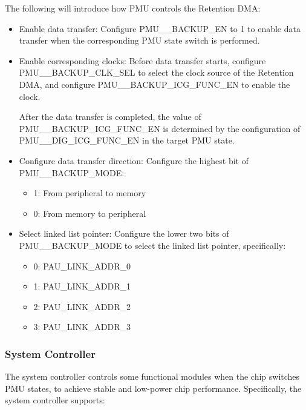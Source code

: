 \documentclass[main\_\_EN.tex]{subfiles}
\begin{document}
The following will introduce how PMU controls the Retention DMA:

\begin{itemize}
    \item Enable data transfer: Configure PMU\_\_BACKUP\_EN to 1 to enable data transfer when the corresponding PMU state switch is performed.
    \item Enable corresponding clocks: Before data transfer starts, configure PMU\_\_BACKUP\_CLK\_SEL to select the clock source of the Retention DMA, and configure PMU\_\_BACKUP\_ICG\_FUNC\_EN to enable the clock.

    After the data transfer is completed, the value of PMU\_\_BACKUP\_ICG\_FUNC\_EN is determined by the configuration of PMU\_\_DIG\_ICG\_FUNC\_EN in the target PMU state.

    \item Configure data transfer direction: Configure the highest bit of PMU\_\_BACKUP\_MODE:
    \begin{itemize}
        \item 1: From peripheral to memory
        \item 0: From memory to peripheral
    \end{itemize}
    \item Select linked list pointer: Configure the lower two bits of PMU\_\_BACKUP\_MODE to select the linked list pointer, specifically:
        \begin{itemize}
        \item 0: PAU\_LINK\_ADDR\_0
        \item 1: PAU\_LINK\_ADDR\_1
        \item 2: PAU\_LINK\_ADDR\_2
        \item 3: PAU\_LINK\_ADDR\_3
        \end{itemize}
\end{itemize}

\subsubsection{System Controller}

The system controller controls some functional modules when the chip switches PMU states, to achieve stable and low-power chip performance. Specifically, the system controller supports:
\end{document}
